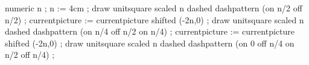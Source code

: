 
\startMPpage[offset=1cm]
    numeric n ; n := 4cm ;
    draw unitsquare scaled n dashed dashpattern (on n/2 off n/2) ;
    currentpicture := currentpicture shifted (-2n,0) ;
    draw unitsquare scaled n dashed dashpattern (on n/4 off n/2 on n/4) ;
    currentpicture := currentpicture shifted (-2n,0) ;
    draw unitsquare scaled n dashed dashpattern (on 0 off n/4 on n/2 off n/4) ;
\stopMPpage

